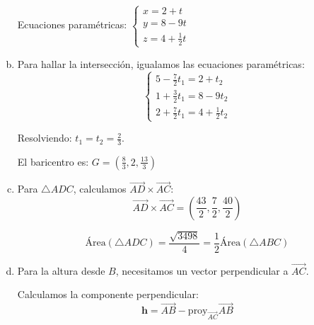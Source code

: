 \begin{prob}
\begin{myproof}
\begin{enumerate}[a)]
\begin{multicols}{2}
Ecuaciones paramétricas: $\boxed{\left\{\begin{matrix}
x = 2 + t\\
y = 8 - 9t\\
z = 4 + \frac{1}{2}t
\end{matrix}\right.}$

\columnbreak
\begin{figure}[H]
\centering
{}
\end{figure}
\end{multicols}

\item Para hallar la intersección, igualamos las ecuaciones paramétricas:
$$\left\{\begin{matrix}
5 - \frac{7}{2}t_1 = 2 + t_2 \\
1 + \frac{3}{2}t_1 = 8 - 9t_2\\
2 + \frac{7}{2}t_1 = 4 + \frac{1}{2}t_2
\end{matrix}\right.$$

Resolviendo: $t_1 = t_2 = \frac{2}{3}$.

El baricentro es: $\boxed{G = \left(\frac{8}{3}, 2, \frac{13}{3}\right)}$

\item Para $\triangle ADC$, calculamos $\overrightarrow{AD} \times \overrightarrow{AC}$:
$$\overrightarrow{AD} \times \overrightarrow{AC} = \left(\frac{43}{2}, \frac{7}{2}, \frac{40}{2}\right)$$

$$\text{Área}(\triangle ADC) = \frac{\sqrt{3498}}{4} = \boxed{\frac{1}{2}\text{Área}(\triangle ABC)}$$

\item Para la altura desde $B$, necesitamos un vector perpendicular a $\overrightarrow{AC}$.

Calculamos la componente perpendicular:
$$\mathbf{h} = \overrightarrow{AB} - \text{proy}_{\overrightarrow{AC}}\overrightarrow{AB}$$


\end{enumerate}
\end{myproof}
\end{prob}
